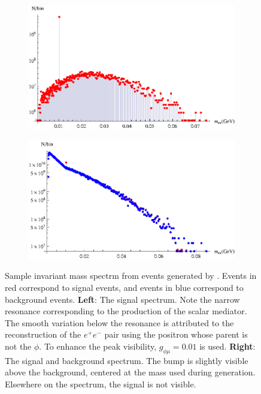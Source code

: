 \begin{figure}[t]
    \centering
    \begin{subfigure}[b]{0.45\textwidth}
        \centering
        \includegraphics[width=\textwidth]{Figures/spectra/mu_eeenunu_scalar}
        \label{fig:mu_eeenunu_scalar_spectrum}
    \end{subfigure}
    \begin{subfigure}[b]{0.45\textwidth}
        \centering
        \includegraphics[width=\textwidth]{Figures/spectra/mu_eeenunu_scalar_background}
        \label{fig:mu_eeenunu_scalar_background_spectrum}
    \end{subfigure}
    \caption{Sample invariant mass spectrm from events generated by \madgraph. Events in red correspond to signal events, and events in blue correspond to background events.
            \textbf{Left}: The signal spectrum. Note the narrow resonance corresponding to the production of the scalar mediator. The smooth variation below the resonance is attributed to the reconstruction of the $e^+e^-$ pair using the positron whose parent is not the $\phi$. To enhance the peak visibility, $g_{\phi\mu} = 0.01$ is used.
            \textbf{Right}: The signal and background spectrum. The bump is slightly visible above the background, centered at the mass used during generation. Elsewhere on the spectrum, the signal is not visible.}
    \label{fig:mu_eeenunu_spectrum}
\end{figure}

